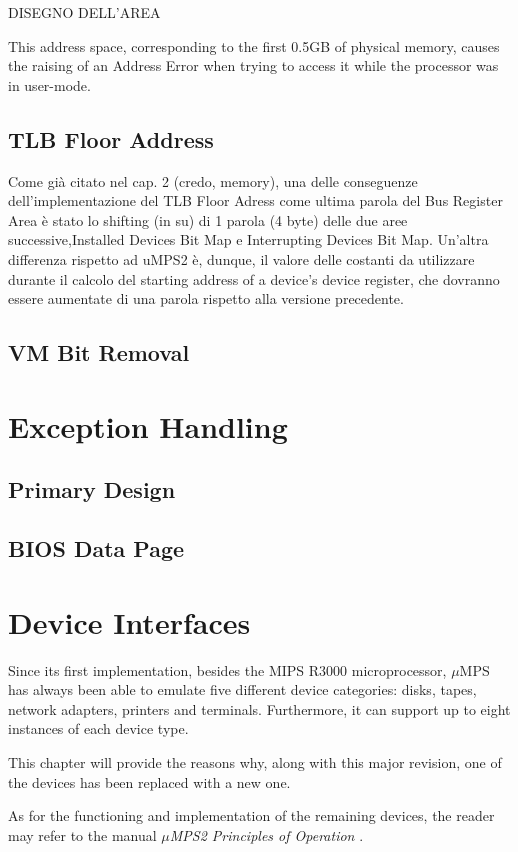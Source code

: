 \documentclass[12pt,a4paper,openright,twoside]{report}
\begin{document}
	  DISEGNO DELL'AREA
	  
	This address space, corresponding to the first 0.5GB of physical memory, causes the raising of an Address Error when trying to access it while the processor was in user-mode.
\section{TLB Floor Address}
Come già citato nel cap. 2 (credo, memory), una delle conseguenze dell'implementazione del TLB Floor Adress come ultima parola del Bus Register Area è stato lo shifting (in su) di 1 parola (4 byte) delle due aree successive,Installed Devices Bit Map e Interrupting Devices Bit Map.
	Un'altra differenza rispetto ad uMPS2 è, dunque, il valore delle costanti da utilizzare durante il calcolo del starting address of a device's device register, che dovranno essere aumentate di una parola rispetto alla versione precedente.
\section{VM Bit Removal}
\chapter{Exception Handling}
\lhead[\fancyplain{}{\bfseries\thepage}]{\fancyplain{}{\bfseries\rightmark}}
\section{Primary Design}
\section{BIOS Data Page}
\lhead[\fancyplain{}{\bfseries\thepage}]{\fancyplain{}{\bfseries\rightmark}}
\chapter{Device Interfaces}
\lhead[\fancyplain{}{\bfseries\thepage}]{\fancyplain{}{\bfseries\rightmark}}
	Since its first implementation, besides the MIPS R3000 microprocessor, $\mu$MPS has always been able to emulate five different device categories: disks, tapes, network adapters, printers and terminals.
	Furthermore, it can support up to eight instances of each device type.

	This chapter will provide the reasons why, along with this major revision, one of the devices has been replaced with a new one.

	As for the functioning and implementation of the remaining devices, the reader may refer to the manual \textit{$\mu$MPS2 Principles of Operation} \cite{pops}.
	
\end{document}
